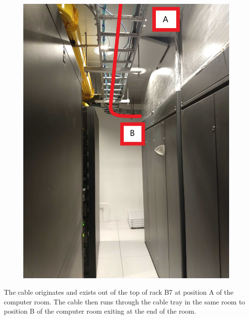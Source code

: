 \begin{figure}
  \includegraphics[width=\textwidth]{images/12.jpg}
  \label{fig:jlsimon}
\end{figure}

The cable originates and exists out of the top of rack B7 at position A of the computer room. The cable then runs through the cable tray in the same room to position B of the computer room exiting at the end of the room.

